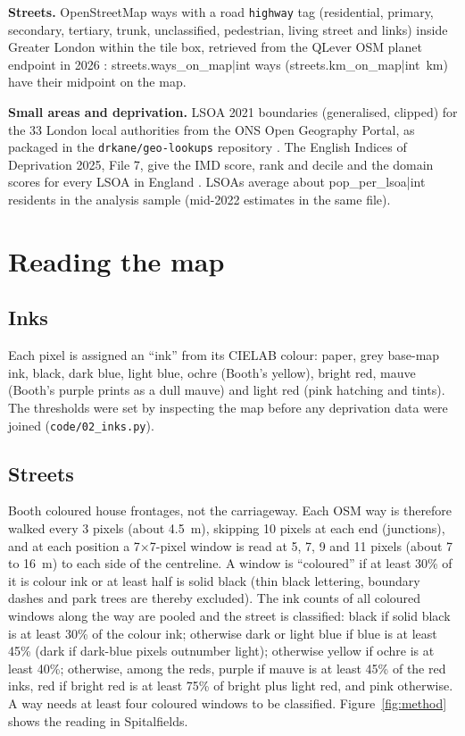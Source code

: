 \textbf{Streets.} OpenStreetMap ways with a road \texttt{highway} tag (residential, primary, secondary, tertiary, trunk, unclassified, pedestrian, living street and links) inside Greater London within the tile box, retrieved from the QLever OSM planet endpoint in 2026 \citep{osm}: {{streets.ways_on_map|int}} ways ({{streets.km_on_map|int}}~km) have their midpoint on the map.

\textbf{Small areas and deprivation.} LSOA 2021 boundaries (generalised, clipped) for the 33 London local authorities from the ONS Open Geography Portal, as packaged in the \texttt{drkane/geo-lookups} repository \citep{geolookups}. The English Indices of Deprivation 2025, File 7, give the IMD score, rank and decile and the domain scores for every LSOA in England \citep{iod2025}. LSOAs average about {{pop_per_lsoa|int}} residents in the analysis sample (mid-2022 estimates in the same file).

\section{Reading the map}\label{sec:measure}

\subsection{Inks}
Each pixel is assigned an ``ink'' from its CIELAB colour: paper, grey base-map ink, black, dark blue, light blue, ochre (Booth's yellow), bright red, mauve (Booth's purple prints as a dull mauve) and light red (pink hatching and tints). The thresholds were set by inspecting the map before any deprivation data were joined (\texttt{code/02\_inks.py}).

\subsection{Streets}
Booth coloured house frontages, not the carriageway. Each OSM way is therefore walked every 3 pixels (about 4.5~m), skipping 10 pixels at each end (junctions), and at each position a 7$\times$7-pixel window is read at 5, 7, 9 and 11 pixels (about 7 to 16~m) to each side of the centreline. A window is ``coloured'' if at least 30\% of it is colour ink or at least half is solid black (thin black lettering, boundary dashes and park trees are thereby excluded). The ink counts of all coloured windows along the way are pooled and the street is classified: black if solid black is at least 30\% of the colour ink; otherwise dark or light blue if blue is at least 45\% (dark if dark-blue pixels outnumber light); otherwise yellow if ochre is at least 40\%; otherwise, among the reds, purple if mauve is at least 45\% of the red inks, red if bright red is at least 75\% of bright plus light red, and pink otherwise. A way needs at least four coloured windows to be classified. Figure~\ref{fig:method} shows the reading in Spitalfields.

